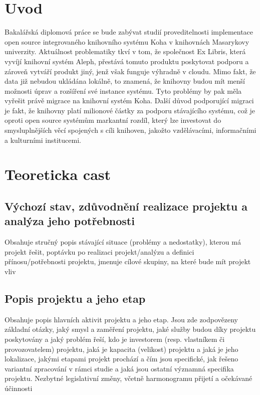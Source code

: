 \documentclass[
	12pt, oneside, printed, final, 
	table,   %
	lof,     %
	lot     %
]{fithesis3}
\begin{document}
{\fontsize{12}{18}

\chapter{Uvod}

Bakalářská diplomová práce se bude zabývat studií proveditelnosti implementace 
open source integrovaného knihovního systému Koha v knihovnách Masarykovy univerzity. 
Aktuálnost problematiky tkví v tom, že společnost Ex Libris, která vyvíjí knihovní 
systém Aleph, přestává tomuto produktu poskytovat podporu a zároveň vytváří produkt jiný, 
jenž však funguje výhradně v cloudu. 
Mimo fakt, že data již nebudou ukládána lokálně, to znamená, že knihovny budou mít 
menší možnosti úprav a rozšíření své instance systému. Tyto problémy by pak měla 
vyřešit právě migrace na knihovní systém Koha. 
Další důvod podporující migraci je fakt, že knihovny platí milionové částky za 
podporu stávajícího systému, což je oproti open source systémům markantní rozdíl, 
který lze investovat do smysluplnějších  věcí spojených s cíli knihoven, 
jakožto vzdělávacími, informačními a kulturními institucemi. 

\chapter{Teoreticka cast }

\section{Výchozí stav, zdůvodnění realizace projektu a analýza jeho potřebnosti}

Obsahuje stručný popis stávající situace (problémy a nedostatky), kterou má projekt
řešit, poptávku po realizaci projekt/analýzu a definici přínosu/potřebnosti projektu,
jmenuje cílové skupiny, na které bude mít projekt vliv

\section{Popis projektu a jeho etap}

Obsahuje popis hlavních aktivit projektu a jeho etap. Jsou zde zodpovězeny základní
otázky, jaký smysl a zaměření projektu, jaké služby budou díky projektu poskytovány
a jaký problém řeší, kdo je investorem (resp. vlastníkem či provozovatelem) projektu,
jaká je kapacita (velikost) projektu a jaká je jeho lokalizace, jakými etapami projekt
prochází a čím jsou specifické, jak řešeno variantní zpracování v rámci studie a jaká
jsou ostatní významná specifika projektu. Nezbytné legislativní změny, včetně
harmonogramu přijetí a očekávané účinnosti

}
\end{document}
